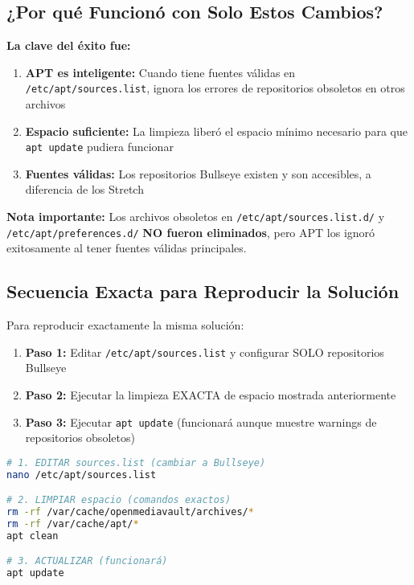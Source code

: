 \documentclass[12pt, a4paper]{article}
\begin{document}
\subsection{¿Por qué Funcionó con Solo Estos Cambios?}
\label{subsec:explicacion_funcionamiento}

\textbf{La clave del éxito fue:}

\begin{enumerate}
    \item \textbf{APT es inteligente:} Cuando tiene fuentes válidas en \texttt{/etc/apt/sources.list}, ignora los errores de repositorios obsoletos en otros archivos
    \item \textbf{Espacio suficiente:} La limpieza liberó el espacio mínimo necesario para que \texttt{apt update} pudiera funcionar
    \item \textbf{Fuentes válidas:} Los repositorios Bullseye existen y son accesibles, a diferencia de los Stretch
\end{enumerate}

\textbf{Nota importante:} Los archivos obsoletos en \texttt{/etc/apt/sources.list.d/} y \texttt{/etc/apt/preferences.d/} \textbf{NO fueron eliminados}, pero APT los ignoró exitosamente al tener fuentes válidas principales.

\subsection{Secuencia Exacta para Reproducir la Solución}
\label{subsec:secuencia_exacta}

Para reproducir exactamente la misma solución:

\begin{enumerate}
    \item \textbf{Paso 1:} Editar \texttt{/etc/apt/sources.list} y configurar SOLO repositorios Bullseye
    \item \textbf{Paso 2:} Ejecutar la limpieza EXACTA de espacio mostrada anteriormente
    \item \textbf{Paso 3:} Ejecutar \texttt{apt update} (funcionará aunque muestre warnings de repositorios obsoletos)
\end{enumerate}

\begin{lstlisting}[language=bash, caption=Secuencia EXACTA que resolvió el problema]
# 1. EDITAR sources.list (cambiar a Bullseye)
nano /etc/apt/sources.list

# 2. LIMPIAR espacio (comandos exactos)
rm -rf /var/cache/openmediavault/archives/*
rm -rf /var/cache/apt/*
apt clean

# 3. ACTUALIZAR (funcionará)
apt update
\end{lstlisting}
\end{document}
